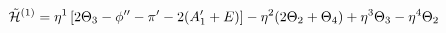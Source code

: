 \begin{equation}
  {\tilde{\cal{H}}^{(1)}}= \eta^1 \left[2\Theta_3 - \phi'' - \pi' -
  2(A'_1+E)\right]-\eta^2 (2\Theta_2 +\Theta_4) + \eta^3 \Theta_3 -
  \eta^4 \Theta_2
  \label{a67}
  \end{equation}

